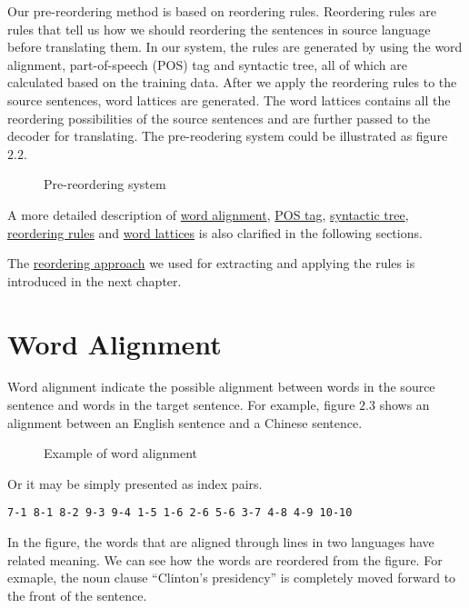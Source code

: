 Our pre-reordering method is based on reordering rules. Reordering rules are rules that tell us how we should reordering the sentences in source language before translating them. In our system, the rules are generated by using the word alignment, part-of-speech (POS) tag and syntactic tree, all of which are calculated based on the training data. After we apply the reordering rules to the source sentences, word lattices are generated. The word lattices contains all the reordering possibilities of the source sentences and are further passed to the decoder for translating. The pre-reodering system could be illustrated as figure $2.2$.

\begin{figure}[H]
\centering

\caption{Pre-reordering system}
\end{figure}

A more detailed description of \hyperref[ch:Foundations:sec:Alignment]{word alignment}, \hyperref[ch:Foundations:sec:PosTag]{POS tag}, \hyperref[ch:Foundations:sec:SyntacticTree]{syntactic tree},
\hyperref[ch:Foundations:sec:types]{reordering rules} and 
\hyperref[ch:Foundations:sec:Lattices]{word lattices} is also clarified in the following sections.

The \hyperref[ch:ReorderingApproach]{reordering approach} we used for extracting and applying the rules is introduced in the next chapter.

\section{Word Alignment}
\label{ch:Foundations:sec:Alignment}

Word alignment indicate the possible alignment between words in the source sentence and words in the target sentence. For example, figure $2.3$ shows an alignment between an English sentence and a Chinese sentence.

\begin{figure}[H]
\centering

\caption{Example of word alignment}
\end{figure}
Or it may be simply presented as index pairs.
\begin{center}
\verb|7-1 8-1 8-2 9-3 9-4 1-5 1-6 2-6 5-6 3-7 4-8 4-9 10-10|
\end{center}

In the figure, the words that are aligned through lines in two languages have related meaning. We can see how the words are reordered from the figure. For exmaple, the noun clause ``Clinton's presidency'' is completely moved forward to the front of the sentence.

